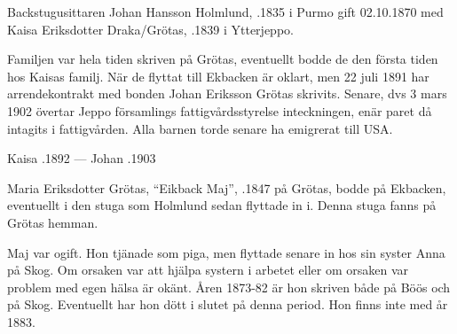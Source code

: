 Backstugusittaren Johan Hansson Holmlund, .1835 i Purmo gift 02.10.1870 med Kaisa Eriksdotter Draka/Grötas, .1839  i Ytterjeppo.
\begin{jhchildren}
  \item {}
  \item {}
  \item {}
  \item {}
\end{jhchildren}
Familjen var hela tiden skriven på Grötas, eventuellt bodde de den första tiden hos Kaisas familj. När de flyttat till Ekbacken är oklart, men 22 juli 1891 har arrendekontrakt med bonden Johan Eriksson Grötas  skrivits. Senare, dvs 3 mars 1902 övertar Jeppo församlings fattigvårdsstyrelse inteckningen, enär paret då intagits i fattigvården. Alla barnen torde senare ha emigrerat till USA.

 Kaisa .1892  ---	Johan .1903


Maria Eriksdotter Grötas, ``Eikback Maj'', .1847 på Grötas, bodde på Ekbacken, eventuellt i den stuga som Holmlund sedan flyttade in i. Denna stuga fanns på Grötas hemman.

Maj var ogift. Hon tjänade som piga, men flyttade senare in hos sin syster Anna på Skog. Om orsaken var att hjälpa systern i arbetet eller om orsaken var problem med egen hälsa är okänt.  Åren 1873-82 är hon skriven både på Böös och på 	Skog. Eventuellt har hon dött i slutet på denna period. Hon finns inte med år 1883.






